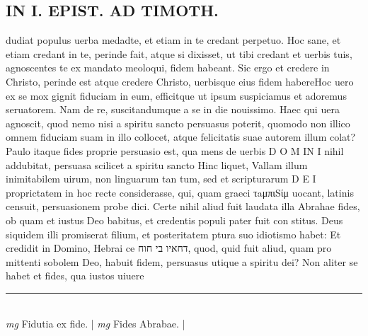 \documentclass{article}
\begin{document}
\begin{pages}
\section*{IN I. EPIST. AD TIMOTH. }\pstart dudiat populus uerba medadte, et etiam in te credant perpetuo. Hoc sane, et etiam credant in te, perinde fait, atque si dixisset, ut tibi credant et uerbis tuis, agnoscentes te ex mandato meoloqui, fidem habeant. Sic ergo et credere in Christo, perinde est atque credere Christo, uerbisque eius fidem habere\pend\pstart Hoc uero ex se mox gignit fiduciam in eum, efficitque ut ipsum suspiciamus et adoremus seruatorem. Nam de re, suscitandumque a se in die nouissimo. Haec qui uera agnoscit, quod nemo nisi a spiritu sancto persuasus poterit, quomodo non illico omnem fiduciam suam in illo collocet, atque felicitatis suae autorem illum colat? Paulo itaque fides proprie persuasio est, qua mens de uerbis D O M IN I nihil addubitat, persuasa scilicet a spiritu sancto Hinc liquet, Vallam illum inimitabilem uirum, non linguarum tan tum, sed et scripturarum D E I proprictatem in hoc recte considerasse, qui, quam graeci τaμπιSίμ uocant, latinis censuit, persuasionem probe dici.  \pend\pstart Certe nihil aliud fuit laudata illa Abrahae fides, ob quam et iustus Deo babitus, et credentis populi pater fuit con stitus.  Deus siquidem illi promiserat filium, et posteritatem ptura suo idiotismo habet: Et credidit in Domino, Hebrai ce דחאיו בי חוח, quod, quid fuit aliud, quam pro mittenti sobolem Deo, habuit fidem, persuasus utique a spiritu dei? Non aliter se habet et fides, qua iustos uiuere  \pend
\vspace{0.5cm}\noindent
\vspace{0.2cm}\rule{1cm}{0.2pt}\\ 
\hspace{0.2cm}\textit{mg}
\footnotesize Fidutia ex fide.  
\normalsize| 
\hspace{0.2cm}\textit{mg}
\footnotesize Fides Abrabae.  
\normalsize| 

\end{pages}
\end{document}
